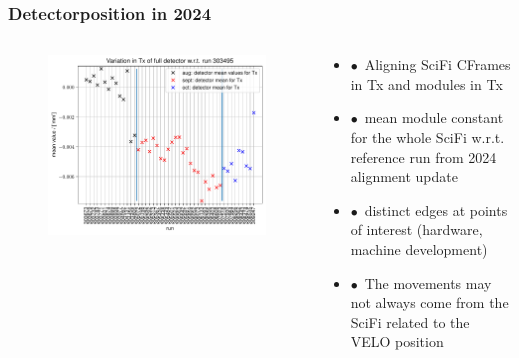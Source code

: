 \documentclass[aspectratio=1610, 12pt, xcolor=dvipsnames]{beamer}
\begin{document}
\begin{frame}\frametitle{Detectorposition in 2024}
  \begin{columns}
    \begin{column}[c]{0.48\textwidth}
      \begin{figure}
        \centering
        \includegraphics[width=\textwidth]{plots/2025_plots_goettingen/scifi_stability_outdir_18102024/full/stabi_test_Tx_full_normal_variation.pdf}
      \end{figure}
    \end{column}
    \begin{column}[c]{0.48\textwidth}
      \begin{itemize}
        \item $\bullet$\, Aligning SciFi CFrames in Tx and modules in Tx
        \item $\bullet$\, mean module constant for the whole SciFi w.r.t. reference run from 2024 alignment update 
        \item $\bullet$\, distinct edges at points of interest (hardware, machine development)
        \item $\bullet$\, The movements may not always come from the SciFi \to related to the VELO position
      \end{itemize}
    \end{column}
  \end{columns}
\end{frame}
\end{document}
